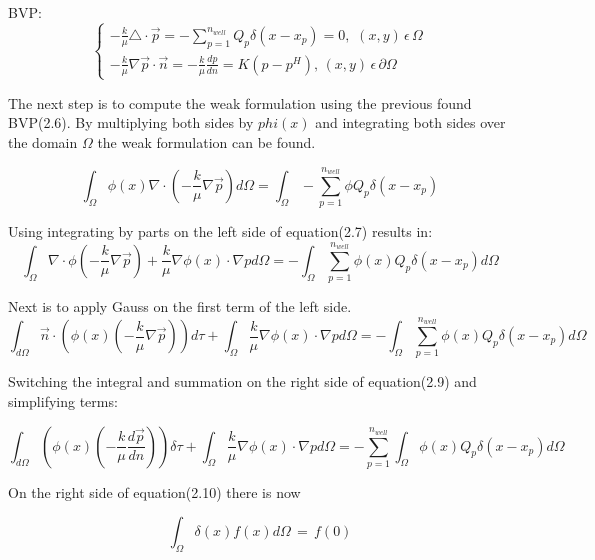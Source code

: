 \documentclass{report}
\begin{document}
BVP:
\begin{equation}
	\begin{cases}
		-\frac{k}{\mu}\triangle\cdot\vec{p}=-\sum_{p=1}^{n_{well}}Q_p\delta(x-x_p)=0,\, \, (x,y) \, \epsilon \, \Omega\\
		-\frac{k}{\mu}\nabla\vec{p}\cdot\vec{n}=-\frac{k}{\mu}\frac{dp}{dn} =K(p-p^H), \, (x,y)\,  \epsilon  \, \partial\Omega
	\end{cases}
\end{equation}

\bigskip

The next step is to compute the weak formulation using the previous found BVP(2.6). By multiplying both sides by $phi(x)$ and integrating both sides over the domain $\Omega$ the weak formulation can be found.

\begin{equation}
	\int_{\Omega}\phi(x)\nabla\cdot( -\frac{k}{\mu}\nabla\vec{p}) d\Omega =\int_{\Omega}-\sum_{p=1}^{n_{well}}\phi  Q_p\delta(x-x_p)
\end{equation}

Using integrating by parts on the left side of equation(2.7) results in:
\begin{equation}
	\int_{\Omega}\nabla\cdot\phi(-\frac{k}{\mu}\nabla\vec{p})+\frac{k}{\mu}\nabla\phi(x)\cdot\nabla p d\Omega= -\int_{\Omega}\sum_{p=1}^{n_{well}}\phi(x) Q_p\delta(x-x_p)d\Omega
\end{equation}

Next is to apply Gauss on the first term of the left side.
\begin{equation}
	\int_{d\Omega}\vec{n}\cdot(\phi(x)(-\frac{k}{\mu}\nabla\vec{p}))d\tau+\int_{\Omega}\frac{k}{\mu}\nabla\phi(x)\cdot\nabla p d\Omega= -\int_{\Omega}\sum_{p=1}^{n_{well}}\phi(x) Q_p\delta(x-x_p)d\Omega
\end{equation}


Switching the integral and summation on the right side of equation(2.9) and simplifying terms:

\begin{equation}
	\int_{d\Omega}(\phi(x)(-\frac{k}{\mu}\frac{d\vec{p}}{dn}))\delta\tau+\int_{\Omega}\frac{k}{\mu}\nabla\phi(x)\cdot\nabla p d\Omega= -\sum_{p=1}^{n_{well}}\int_{\Omega}\phi(x) Q_p\delta(x-x_p)d\Omega
\end{equation}


On the right side of equation(2.10) there is now 

\begin{equation}
	\int_{\Omega}\delta(x)f(x)d\Omega \, = \, f(0)	
\end{equation}
\end{document}
